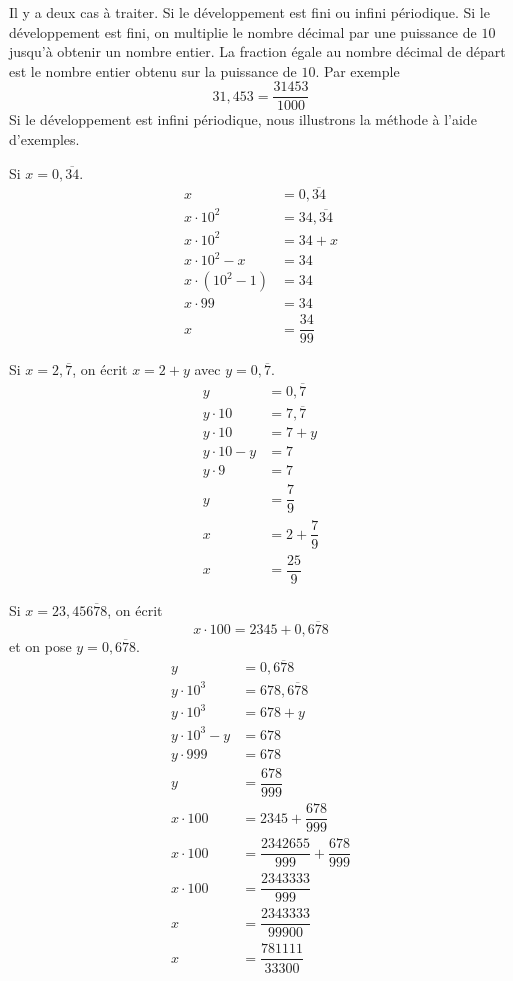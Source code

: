 \documentclass[a4paper,12pt]{report}
\begin{document}
\begin{technique}
	Il y a deux cas à traiter. Si le développement est fini ou infini périodique.
	Si le développement est fini, on multiplie le nombre décimal par une puissance de $10$ jusqu'à obtenir un nombre entier.
	La fraction égale au nombre décimal de départ est le nombre entier obtenu sur la puissance de $10$.
	Par exemple
	\[31,453=\dfrac{31453}{1000}\]
	Si le développement est infini périodique, nous illustrons la méthode à l'aide d'exemples. 

\begin{minipage}[t]{0.25\textwidth}{
\vspace{0pt}
Si $x=0,\overline{34}$.
	\begin{align*}
		x&=0,\overline{34}\\
		x\cdot 10^2&=34,\overline{34}\\
		x\cdot 10^2&=34+x\\
		x\cdot 10^2-x&=34\\
		x\cdot (10^2-1)&=34\\
		x\cdot 99&=34\\
		x&=\dfrac{34}{99}
	\end{align*}
}
\end{minipage}
\hfill
\begin{minipage}[t]{0.3\textwidth}{
\vspace{0pt}
Si $x=2,\overline{7}$, on écrit $x=2+y$ avec $y=0,\overline{7}$.
	\begin{align*}
		y&=0,\overline{7}\\
		y\cdot 10&=7,\overline{7}\\
		y\cdot 10&=7+y\\
		y\cdot 10-y&=7\\
		y\cdot 9&=7\\
		y&=\dfrac{7}{9}\\
		x&=2+\dfrac{7}{9}\\
		x&=\dfrac{25}{9}
	\end{align*}

}
\end{minipage}
\hfill
\begin{minipage}[t]{0.3\textwidth}{
\vspace{0pt}
Si $x=23,45\overline{678}$, on écrit \[x\cdot 100=2345+0,\overline{678}\] et on pose $y=0,\overline{678}$. 
\begin{align*}
	y&=0,\overline{678}\\
	y\cdot 10^3&=678,\overline{678}\\
	y\cdot 10^3&=678+y\\
	y\cdot 10^3-y&=678\\
	y\cdot 999&=678\\
	y&=\dfrac{678}{999}\\
	x\cdot 100&=2345+\dfrac{678}{999}\\
	x\cdot 100&=\dfrac{2342655}{999}+\dfrac{678}{999}\\
	x\cdot 100&=\dfrac{2343333}{999}\\
	x&=\dfrac{2343333}{99900}\\
x&=\dfrac{781111}{33300}
\end{align*}
}
\end{minipage}
\end{technique}
\end{document}
